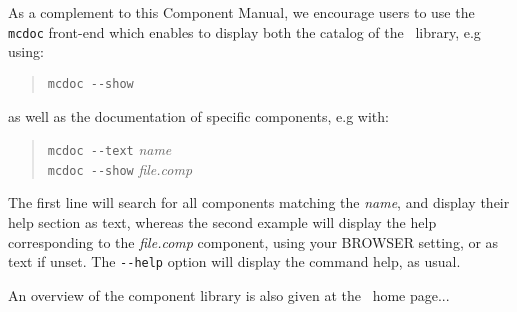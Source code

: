 As a complement to this Component Manual, we encourage users to use
the \verb+mcdoc+ front-end which enables to display both the
catalog of the \MCS\ library, e.g using: 
\begin{quote}
  \verb|mcdoc --show|
\end{quote}
as well as the documentation of specific components, e.g with:
\begin{quote}
  \verb|mcdoc --text| {\it name} \\
  \verb|mcdoc --show| {\it file.comp}
\end{quote}
The first line will search for all components matching the {\it name},
and display their help section as text,
whereas the second example will display the help corresponding to
the {\it file.comp} component, using your
BROWSER setting, or as text if unset.
The \verb+--help+ option will display the command help, as usual.

An overview of the component library is also given at the \MCS\ home page...

%
%
%
%
%
%
%
%






%